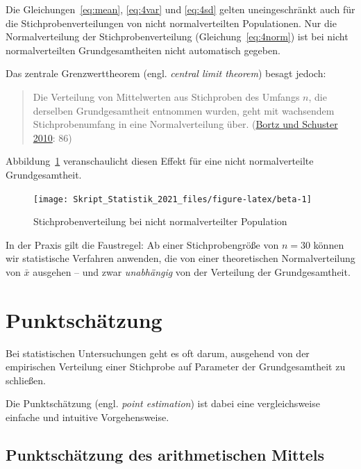 \documentclass[
  11pt,
  ngerman,
  a4paper,
]{report}
\begin{document}
Die Gleichungen~\eqref{eq:mean}, \eqref{eq:4var} und \eqref{eq:4sd} gelten uneingeschränkt auch für die Stichprobenverteilungen von nicht normalverteilten Populationen. Nur die Normalverteilung der Stichprobenverteilung (Gleichung~\eqref{eq:4norm}) ist bei nicht normalverteilten Grundgesamtheiten nicht automatisch gegeben.

Das zentrale Grenzwerttheorem (engl. \emph{central limit theorem}) besagt jedoch:

\begin{quote}
Die Verteilung von Mittelwerten aus Stichproben des Umfangs \(n\), die derselben Grundgesamtheit entnommen wurden, geht mit wachsendem Stichprobenumfang in eine Normalverteilung über. (\protect\hyperlink{ref-bortz}{Bortz und Schuster 2010}: 86)
\end{quote}

Abbildung~\ref{fig:beta} veranschaulicht diesen Effekt für eine nicht normalverteilte Grundgesamtheit.

\begin{figure}[!h]

{\centering \texttt{[image: Skript\_Statistik\_2021\_files/figure-latex/beta-1]} 

}

\caption{Stichprobenverteilung bei nicht normalverteilter Population}\label{fig:beta}
\end{figure}

In der Praxis gilt die Faustregel: Ab einer Stichprobengröße von \(n=30\) können wir statistische Verfahren anwenden, die von einer theoretischen Normalverteilung von \(\bar{x}\) ausgehen -- und zwar \emph{unabhängig} von der Verteilung der Grundgesamtheit.

\hypertarget{punktschuxe4tzung}{%
\section{Punktschätzung}\label{punktschuxe4tzung}}

Bei statistischen Untersuchungen geht es oft darum, ausgehend von der empirischen Verteilung einer Stichprobe auf Parameter der Grundgesamtheit zu schließen.

Die Punktschätzung (engl. \emph{point estimation}) ist dabei eine vergleichsweise einfache und intuitive Vorgehensweise.

\hypertarget{punktschuxe4tzung-des-arithmetischen-mittels}{%
\subsection{Punktschätzung des arithmetischen Mittels}\label{punktschuxe4tzung-des-arithmetischen-mittels}}
\end{document}
